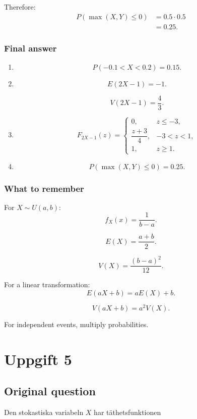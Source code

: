 \documentclass[10pt]{article}
\begin{document}
Therefore:
\begin{align*}
P(\max(X,Y)\le 0)
&=
0.5\cdot 0.5
\\[2mm]
&=
0.25.
\end{align*}

\subsubsection*{Final answer}

\begin{enumerate}[label=\alph*)]
\item
\[
P(-0.1<X<0.2)=0.15.
\]

\item
\[
E(2X-1)=-1.
\]

\[
V(2X-1)=\frac43.
\]

\item
\[
F_{2X-1}(z)=
\begin{cases}
0,
& z\le -3,\\
\dfrac{z+3}{4},
& -3<z<1,\\
1,
& z\ge 1.
\end{cases}
\]

\item
\[
P(\max(X,Y)\le 0)=0.25.
\]
\end{enumerate}

\subsubsection*{What to remember}

For \(X\sim U(a,b)\):
\[
f_X(x)=\frac{1}{b-a}.
\]

\[
E(X)=\frac{a+b}{2}.
\]

\[
V(X)=\frac{(b-a)^2}{12}.
\]

For a linear transformation:
\[
E(aX+b)=aE(X)+b.
\]

\[
V(aX+b)=a^2V(X).
\]

For independent events, multiply probabilities.

\section*{Uppgift 5}

\subsection*{Original question}

Den stokastiska variabeln \(X\) har täthetsfunktionen
\end{document}
